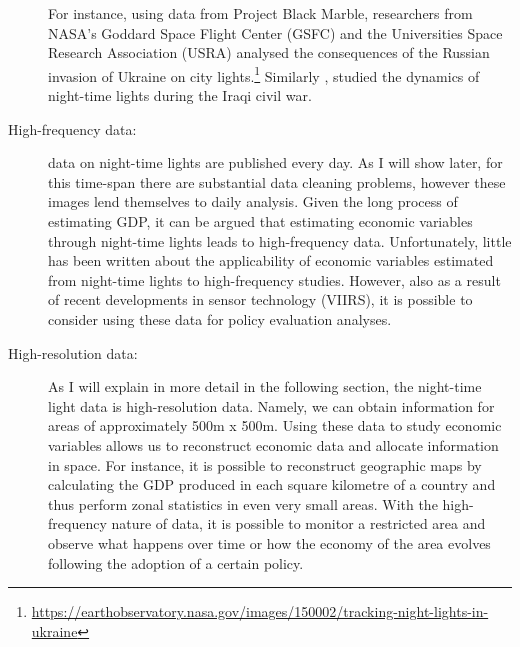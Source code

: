 \begin{description}
For instance, using data from Project Black Marble, researchers from NASA's Goddard Space Flight Center (GSFC) and the Universities Space Research Association (USRA) analysed the consequences of the Russian invasion of Ukraine on city lights.\footnote{\url{https://earthobservatory.nasa.gov/images/150002/tracking-night-lights-in-ukraine}}
Similarly \citep{li2018night}, studied the dynamics of night-time lights during the Iraqi civil war.
\item[High-frequency data:] data on night-time lights are published every day. As I will show later, for this time-span there are substantial data cleaning problems, however these images lend themselves to daily analysis. Given the long process of estimating GDP, it can be argued that estimating economic variables through night-time lights leads to high-frequency data. Unfortunately, little has been written about the applicability of economic variables estimated from night-time lights to high-frequency studies. However, also as a result of recent developments in sensor technology (VIIRS), it is possible to consider using these data for policy evaluation analyses.
\item[High-resolution data:]
As I will explain in more detail in the following section, the night-time light data is high-resolution data. Namely, we can obtain information for areas of approximately 500m x 500m.
Using these data to study economic variables allows us to reconstruct economic data and allocate information in space. For instance, it is possible to reconstruct geographic maps by calculating the GDP produced in each square kilometre of a country and thus perform zonal statistics in even very small areas. With the high-frequency nature of data, it is possible to monitor a restricted area and observe what happens over time or how the economy of the area evolves following the adoption of a certain policy.
\end{description}




